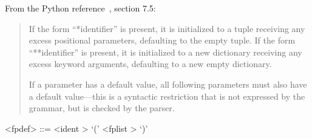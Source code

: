 
From the Python reference~\cite{pythonlang}, section 7.5:
\begin{quote}
If the form ``*identifier'' is present, it is initialized to a tuple receiving 
any excess positional parameters, defaulting to the empty tuple. 
If the form ``**identifier'' is present, it is initialized to a new dictionary 
receiving any excess keyword arguments, defaulting to a new empty dictionary.

If a parameter has a default value, all following parameters must also have a 
default value---this is a syntactic restriction that is not expressed by the grammar, but is checked by the parser.   
\end{quote}

\label{fpdefb}

\begin{grammar}
<fpdef> ::= <ident \myref[identb]>
	\alt `(' <fplist \myref[fplistb]> `)'
\end{grammar}


